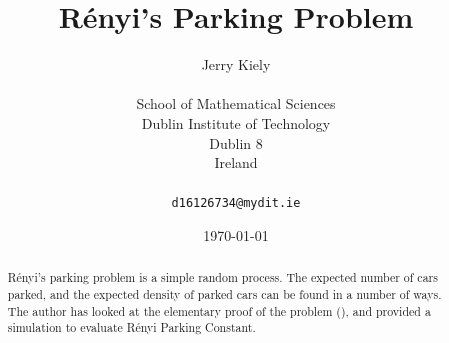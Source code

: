 \documentclass{report}
\begin{document}
\title{R\'{e}nyi's Parking Problem}
\author{Jerry Kiely\\
		\\
		School of Mathematical Sciences\\
		Dublin Institute of Technology\\
		Dublin 8\\
		Ireland\\
		\\
		\texttt{d16126734@mydit.ie}}
\date{\today}
\maketitle


\tableofcontents
\lstlistoflistings

\newpage





\begin{abstract}
R\'{e}nyi's parking problem is a simple random process. The expected number of cars parked, and the expected 
density of parked cars can be found in a number of ways. The author has looked at the elementary proof of 
the problem (\cite{rppr,etpp}), and provided a simulation to evaluate R\'{e}nyi Parking Constant. \bigskip
\end{abstract}
\end{document}
